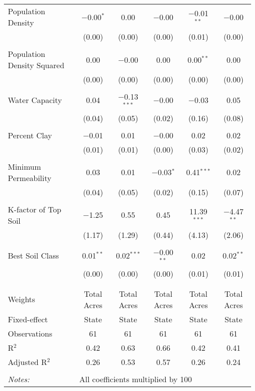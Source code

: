 \documentclass[10pt]{article}
\begin{document}
\begin{table}[!htbp]
\begin{tabular}{@{\extracolsep{5pt}}lccccc}
 Population Density & $-$0.00$^{*}$ & 0.00 & $-$0.00 & $-$0.01$^{**}$ & $-$0.00 \\ 
  & (0.00) & (0.00) & (0.00) & (0.01) & (0.00) \\ 
  & & & & & \\ 
 Population Density Squared & 0.00 & $-$0.00 & 0.00 & 0.00$^{**}$ & 0.00 \\ 
  & (0.00) & (0.00) & (0.00) & (0.00) & (0.00) \\ 
  & & & & & \\ 
 Water Capacity & 0.04 & $-$0.13$^{***}$ & $-$0.00 & $-$0.03 & 0.05 \\ 
  & (0.04) & (0.05) & (0.02) & (0.16) & (0.08) \\ 
  & & & & & \\ 
 Percent Clay & $-$0.01 & 0.01 & $-$0.00 & 0.02 & 0.02 \\ 
  & (0.01) & (0.01) & (0.00) & (0.03) & (0.02) \\ 
  & & & & & \\ 
 Minimum Permeability & 0.03 & 0.01 & $-$0.03$^{*}$ & 0.41$^{***}$ & 0.02 \\ 
  & (0.04) & (0.05) & (0.02) & (0.15) & (0.07) \\ 
  & & & & & \\ 
 K-factor of Top Soil & $-$1.25 & 0.55 & 0.45 & 11.39$^{***}$ & $-$4.47$^{**}$ \\ 
  & (1.17) & (1.29) & (0.44) & (4.13) & (2.06) \\ 
  & & & & & \\ 
 Best Soil Class & 0.01$^{**}$ & 0.02$^{***}$ & $-$0.00$^{**}$ & 0.02 & 0.02$^{**}$ \\ 
  & (0.00) & (0.00) & (0.00) & (0.01) & (0.01) \\ 
  & & & & & \\ 
\hline \\[-1.8ex] 
Weights & Total Acres & Total Acres & Total Acres & Total Acres & Total Acres \\ 
Fixed-effect & State & State & State & State & State \\ 
Observations & 61 & 61 & 61 & 61 & 61 \\ 
R$^{2}$ & 0.42 & 0.63 & 0.66 & 0.42 & 0.41 \\ 
Adjusted R$^{2}$ & 0.26 & 0.53 & 0.57 & 0.26 & 0.24 \\ 
\hline 
\hline \\[-1.8ex] 
\textit{Notes:} & \multicolumn{5}{l}{All coefficients multiplied by 100} \\ 
\end{tabular} 
\end{table} 
\end{document}

